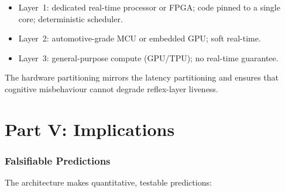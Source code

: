 \documentclass[11pt,twocolumn]{article}
\theoremstyle{definition}
\theoremstyle{remark}
\begin{document}
\begin{itemize}[leftmargin=*,itemsep=2pt]
\item Layer~1: dedicated real-time processor or FPGA; code pinned to a single core; deterministic scheduler.
\item Layer~2: automotive-grade MCU or embedded GPU; soft real-time.
\item Layer~3: general-purpose compute (GPU/TPU); no real-time guarantee.
\end{itemize}

The hardware partitioning mirrors the latency partitioning and ensures that cognitive misbehaviour cannot degrade reflex-layer liveness.

\bigskip

\part*{Part V: Implications}

\section{Falsifiable Predictions}
\label{sec:predictions}

The architecture makes quantitative, testable predictions:
\end{document}
